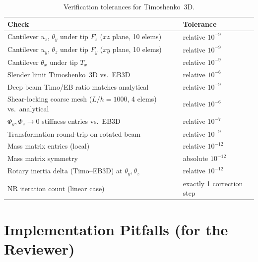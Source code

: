 \documentclass[11pt,a4paper]{article}
\begin{document}
\begin{table}[h!]
\centering
\small
\begin{tabular}{l l}
\toprule
Check & Tolerance \\
\midrule
Cantilever $u_z$, $\theta_y$ under tip $F_z$ ($xz$ plane, 10 elems) & relative $10^{-9}$ \\
Cantilever $u_y$, $\theta_z$ under tip $F_y$ ($xy$ plane, 10 elems) & relative $10^{-9}$ \\
Cantilever $\theta_x$ under tip $T_x$                                & relative $10^{-9}$ \\
Slender limit Timoshenko~3D vs.\ EB3D                                & relative $10^{-6}$ \\
Deep beam Timo/EB ratio matches analytical                           & relative $10^{-9}$ \\
Shear-locking coarse mesh ($L/h = 1000$, 4 elems) vs.\ analytical    & relative $10^{-6}$ \\
$\Phi_y, \Phi_z \to 0$ stiffness entries vs.\ EB3D                   & relative $10^{-7}$ \\
Transformation round-trip on rotated beam                            & relative $10^{-9}$ \\
Mass matrix entries (local)                                          & relative $10^{-12}$ \\
Mass matrix symmetry                                                  & absolute $10^{-12}$ \\
Rotary inertia delta (Timo--EB3D) at $\theta_y, \theta_z$           & relative $10^{-12}$ \\
NR iteration count (linear case)                                     & exactly 1 correction step \\
\bottomrule
\end{tabular}
\caption{Verification tolerances for Timoshenko~3D.}
\end{table}

\section{Implementation Pitfalls (for the Reviewer)}
\end{document}
